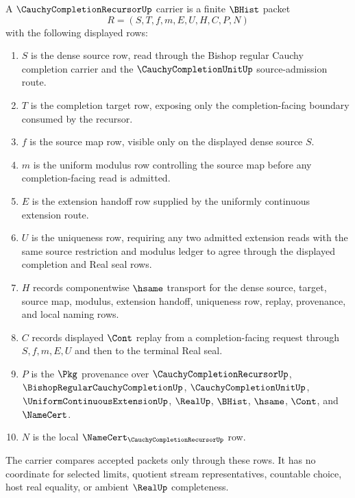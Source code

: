 \begin{definition}
\label{def:cauchy-completion-recursor-carrier}
A $\CauchyCompletionRecursorUp$ carrier is a finite $\BHist$ packet
$$
R=(S,T,f,m,E,U,H,C,P,N)
$$
with the following displayed rows:
\begin{enumerate}
\item $S$ is the dense source row, read through the Bishop regular Cauchy completion carrier and the $\CauchyCompletionUnitUp$ source-admission route.
\item $T$ is the completion target row, exposing only the completion-facing boundary consumed by the recursor.
\item $f$ is the source map row, visible only on the displayed dense source $S$.
\item $m$ is the uniform modulus row controlling the source map before any completion-facing read is admitted.
\item $E$ is the extension handoff row supplied by the uniformly continuous extension route.
\item $U$ is the uniqueness row, requiring any two admitted extension reads with the same source restriction and modulus ledger to agree through the displayed completion and Real seal rows.
\item $H$ records componentwise $\hsame$ transport for the dense source, target, source map, modulus, extension handoff, uniqueness row, replay, provenance, and local naming rows.
\item $C$ records displayed $\Cont$ replay from a completion-facing request through $S,f,m,E,U$ and then to the terminal Real seal.
\item $P$ is the $\Pkg$ provenance over $\CauchyCompletionRecursorUp$, $\BishopRegularCauchyCompletionUp$, $\CauchyCompletionUnitUp$, $\UniformContinuousExtensionUp$, $\RealUp$, $\BHist$, $\hsame$, $\Cont$, and $\NameCert$.
\item $N$ is the local $\NameCert_{\CauchyCompletionRecursorUp}$ row.
\end{enumerate}
The carrier compares accepted packets only through these rows. It has no coordinate for selected limits, quotient stream representatives, countable choice, host real equality, or ambient $\RealUp$ completeness.
\end{definition}

